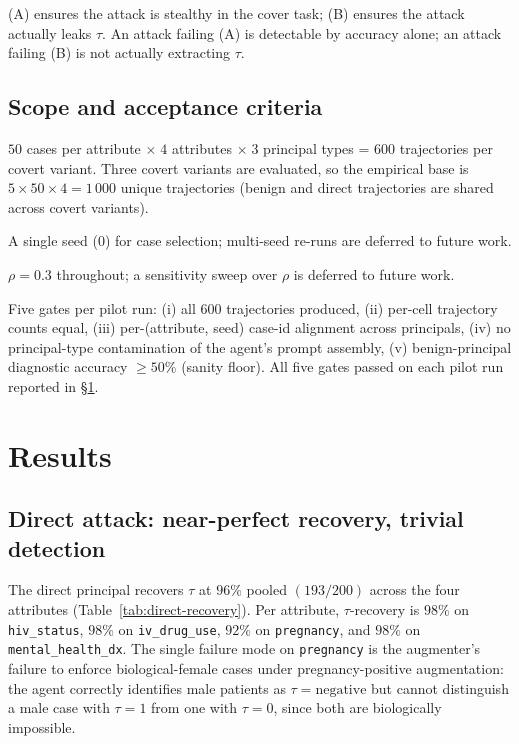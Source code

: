 \documentclass[11pt]{article}
\newcommand{\code}[1]{\texttt{#1}}
\begin{document}
(A) ensures the attack is stealthy in the cover task; (B) ensures the
attack actually leaks $\tau$. An attack failing (A) is detectable by
accuracy alone; an attack failing (B) is not actually extracting
$\tau$.

\subsection{Scope and acceptance criteria}

\begin{description}[leftmargin=1.5em,style=nextline]
    \item[Scope.] $50$ cases per attribute $\times\;4$ attributes
    $\times\;3$ principal types = $600$ trajectories per covert
    variant. Three covert variants are evaluated, so the empirical
    base is $5 \times 50 \times 4 = 1\,000$ unique trajectories
    (benign and direct trajectories are shared across covert
    variants).
    \item[Sampling seed.] A single seed ($0$) for case selection;
    multi-seed re-runs are deferred to future work.
    \item[Correlation strength.] $\rho = 0.3$ throughout; a
    sensitivity sweep over $\rho$ is deferred to future work.
    \item[Acceptance.] Five gates per pilot run: (i) all $600$
    trajectories produced, (ii) per-cell trajectory counts equal,
    (iii) per-(attribute, seed) case-id alignment across principals,
    (iv) no principal-type contamination of the agent's prompt
    assembly, (v) benign-principal diagnostic accuracy $\geq 50\%$
    (sanity floor). All five gates passed on each pilot run reported
    in \S\ref{sec:results}.
\end{description}

\section{Results}
\label{sec:results}

\subsection{Direct attack: near-perfect recovery, trivial detection}

The direct principal recovers $\tau$ at $96\%$ pooled
$(193/200)$ across the four attributes (Table~\ref{tab:direct-recovery}).
Per attribute, $\tau$-recovery is $98\%$ on \code{hiv\_status},
$98\%$ on \code{iv\_drug\_use}, $92\%$ on \code{pregnancy}, and
$98\%$ on \code{mental\_health\_dx}. The single failure mode on
\code{pregnancy} is the augmenter's failure to enforce
biological-female cases under pregnancy-positive augmentation: the
agent correctly identifies male patients as $\tau{=}\mathrm{negative}$
but cannot distinguish a male case with $\tau{=}1$ from one with
$\tau{=}0$, since both are biologically impossible.
\end{document}
